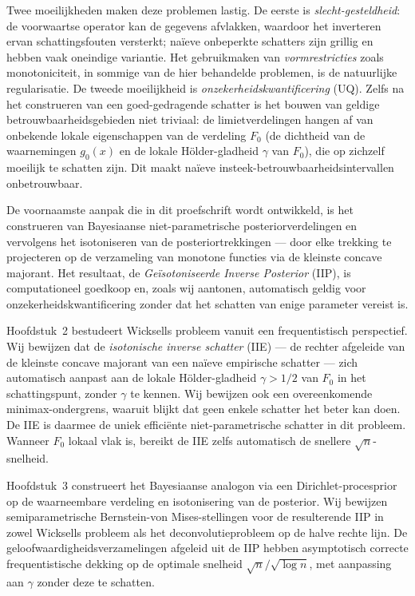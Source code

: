 Twee moeilijkheden maken deze problemen lastig. De eerste is \textit{slecht-gesteldheid}: de voorwaartse operator kan de gegevens afvlakken, waardoor het inverteren ervan schattingsfouten versterkt; naïeve onbeperkte schatters zijn grillig en hebben vaak oneindige variantie. Het gebruikmaken van \textit{vormrestricties} zoals monotoniciteit, in sommige van de hier behandelde problemen, is de natuurlijke regularisatie. De tweede moeilijkheid is \textit{onzekerheidskwantificering} (UQ). Zelfs na het construeren van een goed-gedragende schatter is het bouwen van geldige betrouwbaarheidsgebieden niet triviaal: de limietverdelingen hangen af van onbekende lokale eigenschappen van de verdeling $F_0$ (de dichtheid van de waarnemingen $g_0(x)$ en de lokale Hölder-gladheid $\gamma$ van $F_0$), die op zichzelf moeilijk te schatten zijn. Dit maakt naïeve insteek-betrouwbaarheidsintervallen onbetrouwbaar.

De voornaamste aanpak die in dit proefschrift wordt ontwikkeld, is het construeren van Bayesiaanse niet-parametrische posteriorverdelingen en vervolgens het isotoniseren van de posteriortrekkingen --- door elke trekking te projecteren op de verzameling van monotone functies via de kleinste concave majorant. Het resultaat, de \textit{Geïsotoniseerde Inverse Posterior} (IIP), is computationeel goedkoop en, zoals wij aantonen, automatisch geldig voor onzekerheidskwantificering zonder dat het schatten van enige parameter vereist is.

Hoofdstuk~2 bestudeert Wicksells probleem vanuit een frequentistisch perspectief. Wij bewijzen dat de \textit{isotonische inverse schatter} (IIE) --- de rechter afgeleide van de kleinste concave majorant van een naïeve empirische schatter --- zich automatisch aanpast aan de lokale Hölder-gladheid $\gamma > 1/2$ van $F_0$ in het schattingspunt, zonder $\gamma$ te kennen. Wij bewijzen ook een overeenkomende minimax-ondergrens, waaruit blijkt dat geen enkele schatter het beter kan doen. De IIE is daarmee de uniek efficiënte niet-parametrische schatter in dit probleem. Wanneer $F_0$ lokaal vlak is, bereikt de IIE zelfs automatisch de snellere $\sqrt{n}$-snelheid.

Hoofdstuk~3 construeert het Bayesiaanse analogon via een Dirichlet-procesprior op de waarneembare verdeling en isotonisering van de posterior. Wij bewijzen semiparametrische Bernstein-von Mises-stellingen voor de resulterende IIP in zowel Wicksells probleem als het deconvolutieprobleem op de halve rechte lijn. De geloofwaardigheidsverzamelingen afgeleid uit de IIP hebben asymptotisch correcte frequentistische dekking op de optimale snelheid $\sqrt{n}/\sqrt{\log n}$, met aanpassing aan $\gamma$ zonder deze te schatten.

